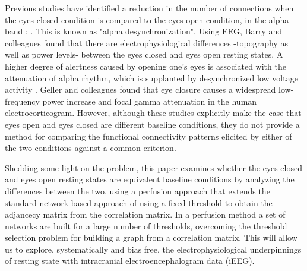 \documentclass[11pt, onecolumn]{article}
\begin{document}
Previous studies have identified a reduction in the number of connections when the eyes closed condition is compared to the eyes open condition, in the alpha band \citep{tan2013difference}; \citep{barry2007eeg}. This is known as  "alpha desynchronization". Using EEG, Barry and colleagues \citep{barry2007eeg} found that there are electrophysiological differences -topography as well as power levels- between the eyes closed and eyes open resting states.  
A higher degree of alertness caused by opening one's eyes is associated with the attenuation of alpha rhythm, which is supplanted by desynchronized low voltage activity \citep{niedermeyer2005electroencephalography}.
Geller and colleagues \citep{geller2014eye} found that eye closure causes a widespread low-frequency power increase and focal gamma attenuation in the human electrocorticogram. 
However, although these studies explicitly make the case that eyes open and eyes closed are different baseline conditions, they do not provide a method for comparing the functional connectivity patterns elicited by either of the two conditions against a common criterion.

Shedding some light on the problem, this paper examines whether the eyes closed and eyes open resting states are equivalent baseline conditions by analyzing the differences between the two, using a perfusion approach that extends the standard network-based approach of using a fixed threshold to obtain the adjancecy matrix from the correlation matrix. In a perfusion method a set of networks are built for a large number of thresholds, overcoming the threshold selection problem for building a graph from a correlation matrix.
This will allow us to explore, systematically and bias free, the electrophysiological underpinnings of resting state with intracranial electroencephalogram data (iEEG).
\end{document}

